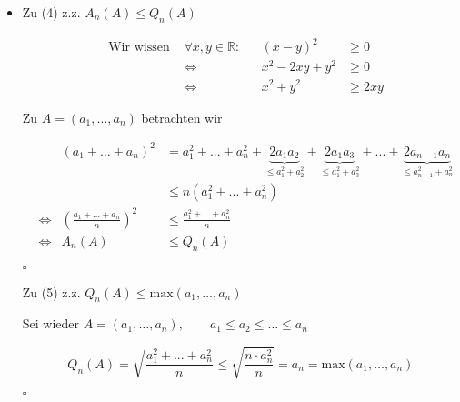 \documentclass[12pt,a4paper,leqno]{article}
\begin{document}
\begin{description}
\begin{itemize}
\item[] Zu (4) z.z. $A_n(A) \leq Q_n (A)$

\begin{align*}
&\textrm{Wir wissen } &\forall x,y \in \mathbb{R}: && (x-y)^2 & \geq 0 \\
&& \Leftrightarrow &&x^2 - 2xy + y^2 &\geq 0 \\
&& \Leftrightarrow &&x^2 + y^2 &\geq 2xy
\end{align*}

Zu $A=(a_1,\dotsc, a_n)$ betrachten wir

\begin{align*}
&&(a_1 +\ldots + a_n)^2 &= a_1^2 + ... + a_n^2 + \underbrace{2a_1 a_2}_{\leq a_1^2+a_2^2} + \underbrace{2a_1 a_3}_{\leq a_1^2+a_3^2} + ... + \underbrace{2a_{n-1} a_n}_{\leq a_{n-1}^2+a_n^2} \\
&&& \leq n ( a_1^2 + ... + a_n^2 ) \\
&\Leftrightarrow &\left( \frac{a_1 + \ldots + a_n}{n} \right) ^ 2 &\leq \frac{a_1^2 + ... + a_n^2}{n} \\
&\Leftrightarrow &A_n(A) &\leq Q_n(A)
\end{align*}
\begin{flushright}$\square$\end{flushright}

Zu (5) z.z. $Q_n(A) \leq \textrm{max}(a_1,\dotsc, a_n)$

Sei wieder $A = (a_1,\dotsc, a_n) , \qquad a_1 \leq a_2 \leq \ldots \leq a_n$

$$Q_n(A) = \sqrt{\frac{a_1^2 + ... + a_n^2}{n}} \leq \sqrt{\frac{n \cdot a_n^2}{n}} = a_n = \textrm{max}(a_1,\dotsc, a_n)$$

\begin{flushright}$\square$\end{flushright}
\end{itemize}
\end{description}
\end{document}
